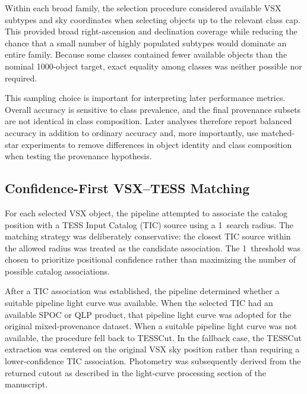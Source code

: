 \documentclass[linenumbers]{aastex701}
\begin{document}
Within each broad family, the selection procedure considered available VSX subtypes and sky coordinates when selecting objects up to the relevant class cap. This provided broad right-ascension and declination coverage while reducing the chance that a small number of highly populated subtypes would dominate an entire family. Because some classes contained fewer available objects than the nominal 1000-object target, exact equality among classes was neither possible nor required.

This sampling choice is important for interpreting later performance metrics. Overall accuracy is sensitive to class prevalence, and the final provenance subsets are not identical in class composition. Later analyses therefore report balanced accuracy in addition to ordinary accuracy and, more importantly, use matched-star experiments to remove differences in object identity and class composition when testing the provenance hypothesis.


\subsection{Confidence-First VSX--TESS Matching}
\label{subsec:crossmatch}

For each selected VSX object, the pipeline attempted to associate the catalog position with a TESS Input Catalog (TIC) source using a 1\arcsec\ search radius. The matching strategy was deliberately conservative: the closest TIC source within the allowed radius was treated as the candidate association. The 1\arcsec\ threshold was chosen to prioritize positional confidence rather than maximizing the number of possible catalog associations.

After a TIC association was established, the pipeline determined whether a suitable pipeline light curve was available. When the selected TIC had an available SPOC or QLP product, that pipeline light curve was adopted for the original mixed-provenance dataset. When a suitable pipeline light curve was not available, the procedure fell back to TESSCut. In the fallback case, the TESSCut extraction was centered on the original VSX sky position rather than requiring a lower-confidence TIC association. Photometry was subsequently derived from the returned cutout as described in the light-curve processing section of the manuscript.
\end{document}

